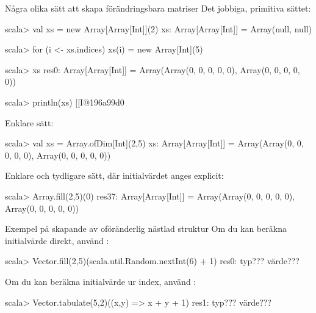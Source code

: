 \begin{Slide}{Några olika sätt att skapa förändringsbara matriser}\SlideFontSmall
Det jobbiga, primitiva sättet:
\begin{REPL}
scala> val xs = new Array[Array[Int]](2)
xs: Array[Array[Int]] = Array(null, null)

scala> for (i <- xs.indices) {xs(i) = new Array[Int](5)}

scala> xs
res0: Array[Array[Int]] = Array(Array(0, 0, 0, 0, 0), Array(0, 0, 0, 0, 0))

scala> println(xs)
[[I@196a99d0
\end{REPL}
Enklare sätt:
\begin{REPL}
scala> val xs = Array.ofDim[Int](2,5)
xs: Array[Array[Int]] = Array(Array(0, 0, 0, 0, 0), Array(0, 0, 0, 0, 0))
\end{REPL}
Enklare och tydligare sätt, där initialvärdet anges explicit:
\begin{REPL}
scala> Array.fill(2,5)(0)
res37: Array[Array[Int]] = Array(Array(0, 0, 0, 0, 0), Array(0, 0, 0, 0, 0))
\end{REPL}

\end{Slide}

\begin{Slide}{Exempel på skapande av oföränderlig nästlad struktur}\SlideFontSmall
Om du kan beräkna initialvärde direkt, använd :\\
{\SlideFontTiny{}}
\begin{REPL}
scala> Vector.fill(2,5)(scala.util.Random.nextInt(6) + 1)
res0:
  typ???
  värde???

\end{REPL}
Om du kan beräkna initialvärde ur index, använd :\\
{\SlideFontTiny{}}
\begin{REPL}
scala> Vector.tabulate(5,2)((x,y) => x + y + 1)
res1:
  typ???
  värde???

\end{REPL}
\end{Slide}

